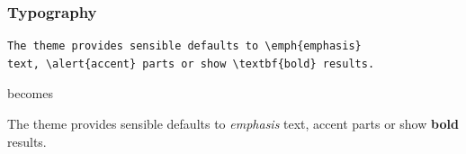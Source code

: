 \documentclass[10pt, compress]{beamer}
\begin{document}


\begin{frame}[fragile]
  \frametitle{Typography}
      \begin{verbatim}
The theme provides sensible defaults to \emph{emphasis}
text, \alert{accent} parts or show \textbf{bold} results.
      \end{verbatim}

  \begin{center}becomes\end{center}

  The theme provides sensible defaults to \emph{emphasis} text,
  \alert{accent} parts or show \textbf{bold} results.
\end{frame}




\end{document}
